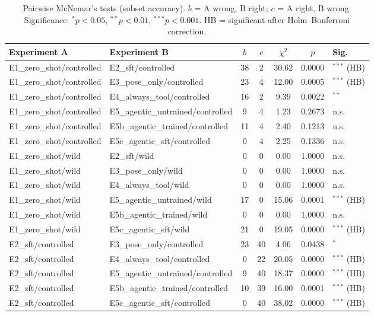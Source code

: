 \begin{table}[t]
\centering
\caption{Pairwise McNemar's tests (subset accuracy). $b$ = A wrong, B right; $c$ = A right, B wrong. Significance: $^*p<0.05$, $^{**}p<0.01$, $^{***}p<0.001$. HB = significant after Holm--Bonferroni correction.}
\label{tab:mcnemar}
\small
\begin{tabular}{llccccl}
\toprule
Experiment A & Experiment B & $b$ & $c$ & $\chi^2$ & $p$ & Sig. \\
\midrule
E1\_zero\_shot/controlled & E2\_sft/controlled & 38 & 2 & 30.62 & 0.0000 & $^{***}$ (HB) \\
E1\_zero\_shot/controlled & E3\_pose\_only/controlled & 23 & 4 & 12.00 & 0.0005 & $^{***}$ (HB) \\
E1\_zero\_shot/controlled & E4\_always\_tool/controlled & 16 & 2 & 9.39 & 0.0022 & $^{**}$ \\
E1\_zero\_shot/controlled & E5\_agentic\_untrained/controlled & 9 & 4 & 1.23 & 0.2673 & n.s. \\
E1\_zero\_shot/controlled & E5b\_agentic\_trained/controlled & 11 & 4 & 2.40 & 0.1213 & n.s. \\
E1\_zero\_shot/controlled & E5c\_agentic\_sft/controlled & 0 & 4 & 2.25 & 0.1336 & n.s. \\
E1\_zero\_shot/wild & E2\_sft/wild & 0 & 0 & 0.00 & 1.0000 & n.s. \\
E1\_zero\_shot/wild & E3\_pose\_only/wild & 0 & 0 & 0.00 & 1.0000 & n.s. \\
E1\_zero\_shot/wild & E4\_always\_tool/wild & 0 & 0 & 0.00 & 1.0000 & n.s. \\
E1\_zero\_shot/wild & E5\_agentic\_untrained/wild & 17 & 0 & 15.06 & 0.0001 & $^{***}$ (HB) \\
E1\_zero\_shot/wild & E5b\_agentic\_trained/wild & 0 & 0 & 0.00 & 1.0000 & n.s. \\
E1\_zero\_shot/wild & E5c\_agentic\_sft/wild & 21 & 0 & 19.05 & 0.0000 & $^{***}$ (HB) \\
E2\_sft/controlled & E3\_pose\_only/controlled & 23 & 40 & 4.06 & 0.0438 & $^{*}$ \\
E2\_sft/controlled & E4\_always\_tool/controlled & 0 & 22 & 20.05 & 0.0000 & $^{***}$ (HB) \\
E2\_sft/controlled & E5\_agentic\_untrained/controlled & 9 & 40 & 18.37 & 0.0000 & $^{***}$ (HB) \\
E2\_sft/controlled & E5b\_agentic\_trained/controlled & 10 & 39 & 16.00 & 0.0001 & $^{***}$ (HB) \\
E2\_sft/controlled & E5c\_agentic\_sft/controlled & 0 & 40 & 38.02 & 0.0000 & $^{***}$ (HB) \\

\end{tabular}
\end{table}
